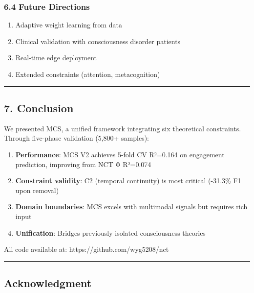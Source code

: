 \documentclass[
]{article}
\providecommand{\tightlist}{%
  \setlength{\itemsep}{0pt}\setlength{\parskip}{0pt}}
\begin{document}
\subsubsection{6.4 Future Directions}\label{future-directions}

\begin{enumerate}
\def\labelenumi{\arabic{enumi}.}
\tightlist
\item
  Adaptive weight learning from data
\item
  Clinical validation with consciousness disorder patients
\item
  Real-time edge deployment
\item
  Extended constraints (attention, metacognition)
\end{enumerate}

\begin{center}\rule{0.5\linewidth}{0.5pt}\end{center}

\subsection{7. Conclusion}\label{conclusion}

We presented MCS, a unified framework integrating six theoretical
constraints. Through five-phase validation (5,800+ samples):

\begin{enumerate}
\def\labelenumi{\arabic{enumi}.}
\tightlist
\item
  \textbf{Performance}: MCS V2 achieves 5-fold CV R²=0.164 on engagement
  prediction, improving from NCT Φ R²=0.074
\item
  \textbf{Constraint validity}: C2 (temporal continuity) is most
  critical (-31.3\% F1 upon removal)
\item
  \textbf{Domain boundaries}: MCS excels with multimodal signals but
  requires rich input
\item
  \textbf{Unification}: Bridges previously isolated consciousness
  theories
\end{enumerate}

All code available at: https://github.com/wyg5208/nct

\begin{center}\rule{0.5\linewidth}{0.5pt}\end{center}

\subsection{Acknowledgment}\label{acknowledgment}
\end{document}

